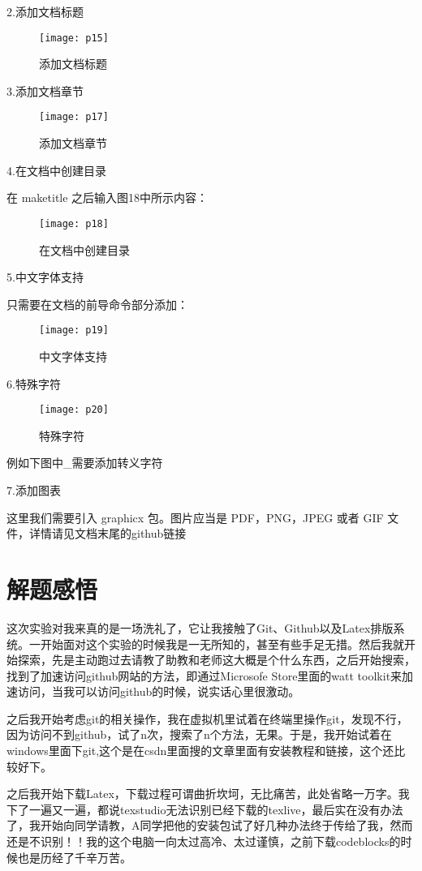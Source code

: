 \documentclass[a4paper ,12pt]{article}
\begin{document}
  2.添加文档标题
  \begin{figure}[h]
  	\centering
  	\texttt{[image: p15]}
  	\caption{添加文档标题}
  \end{figure}
  
  3.添加文档章节
  \begin{figure}[h]
  	\centering
  	\texttt{[image: p17]}
  	\caption{添加文档章节}
  \end{figure}
  
  4.在文档中创建目录
  
  在 maketitle 之后输入图18中所示内容：
  \begin{figure}[h]
  	\centering
  	\texttt{[image: p18]}
  	\caption{在文档中创建目录}
  \end{figure}
  
  5.中文字体支持
  
  只需要在文档的前导命令部分添加：
  \begin{figure}[h]
 	\centering
 	\texttt{[image: p19]}
 	\caption{中文字体支持}
  \end{figure}
  
  6.特殊字符
  
  \begin{figure}[h]
  	\centering
  	\texttt{[image: p20]}
  	\caption{特殊字符}
  \end{figure}
  例如下图中\_需要添加转义字符
  
  
  7.添加图表
  
  这里我们需要引入 graphicx 包。图片应当是 PDF，PNG，JPEG 或者 GIF 文件，详情请见文档末尾的github链接
  \section{解题感悟}
  这次实验对我来真的是一场洗礼了，它让我接触了Git、Github以及Latex排版系统。一开始面对这个实验的时候我是一无所知的，甚至有些手足无措。然后我就开始探索，先是主动跑过去请教了助教和老师这大概是个什么东西，之后开始搜索，找到了加速访问github网站的方法，即通过Microsofe Store里面的watt toolkit来加速访问，当我可以访问github的时候，说实话心里很激动。
  
  之后我开始考虑git的相关操作，我在虚拟机里试着在终端里操作git，发现不行，因为访问不到github，试了n次，搜索了n个方法，无果。于是，我开始试着在windows里面下git,这个是在csdn里面搜的文章里面有安装教程和链接，这个还比较好下。
  
  之后我开始下载Latex，下载过程可谓曲折坎坷，无比痛苦，此处省略一万字。我下了一遍又一遍，都说texstudio无法识别已经下载的texlive，最后实在没有办法了，我开始向同学请教，A同学把他的安装包试了好几种办法终于传给了我，然而还是不识别！！我的这个电脑一向太过高冷、太过谨慎，之前下载codeblocks的时候也是历经了千辛万苦。
  
\end{document}
